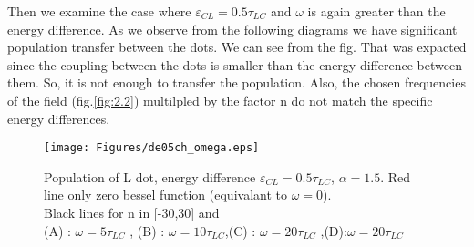 Then we examine the case where $\varepsilon_{CL}=0.5\tau_{LC}$ and $\omega$ is again greater than the energy difference. As we observe from the following diagrams we have significant population transfer between the dots. We can see from the fig. That was expacted since the coupling between the dots is smaller than the energy difference between them. So, it is not enough to transfer the population. Also, the chosen frequencies of the field (fig.\ref{fig:2.2}) multilpled by the factor n do not match the specific energy differences.



\begin{figure}
\centering
\texttt{[image: Figures/de05ch\_omega.eps]}
\decoRule
\caption[Far-off resonance]{Population of L dot, energy difference $\varepsilon_{CL}=0.5\tau_{LC}$, $\alpha=1.5$. Red line only zero bessel function (equivalant to $\omega=0$). \\Black lines for n in [-30,30] and \\ (A) : $\omega=5\tau_{LC}$ , (B) : $\omega=10\tau_{LC}$,(C) : $\omega=20\tau_{LC}$ ,(D):$\omega=20\tau_{LC}$}
\label{fig:2.3}
\end{figure}

